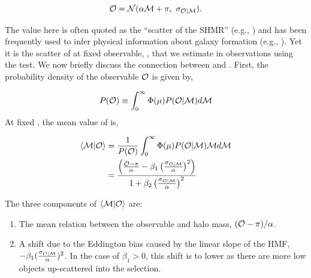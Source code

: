 \documentclass[fleqn,usenatbib,useAMS]{mnras}
\begin{document}
\begin{CJK*}{UTF8}{gbsn}
    \begin{equation}
        {\mathcal{O}} = \mathcal{N}(\alpha {\mathcal{M}} + \pi,\ \sigma_{\mathcal{O} | \mathcal{M}}).
        \label{eq:lognormal_obs_given_mhalo}
    \end{equation}

    The \scatterObsSymMhalo{} value here is often quoted as the ``scatter of the SHMR'' (e.g.,
    \citealt{More2011, Leauthaud2012, Reddick2013, Behroozi2013})
    and has been frequently used to infer physical information about galaxy formation (e.g.,
    \citealt{Gu2016, Matthee2017, Tinker2017c, Wechsler2018}).
    Yet it is the scatter of \mvir{} at fixed observable, \scatterMhaloObsSym{}, that we estimate in
    observations using the \topn{} test.
    We now briefly discuss the connection between \scatterObsSymMhalo{} and \scatterMhaloObsSym{}.
    First, the probability density of the observable ${\mathcal{O}}$ is given by,

    \begin{equation}
        P({\mathcal{O}}{}) \equiv \int_{0}^{\infty} \Phi(\mu){} P({\mathcal{O}}{} | {\mathcal{M}}{}) d{\mathcal{M}}{}
    \end{equation}
    At fixed \obsSym{}, the mean value of \haloSym{} is,

    \begin{equation}
    \begin{aligned}
        \langle {\mathcal{M}}{} | {\mathcal{O}} \rangle
        &= \frac{1}{P({\mathcal{O}})}
            \int_{0}^{\infty} \Phi(\mu){} P({\mathcal{O}}{} | {\mathcal{M}}{}) {\mathcal{M}}{} d{\mathcal{M}}{} \\
        &= \frac{\left( \frac{{\mathcal{O}}- \pi}{\alpha} - \beta_1 \left(\frac{\sigma_{\mathcal{O} | \mathcal{M}}}{\alpha}\right)^2 \right)}{ 1 + \beta_2 \left(\frac{\sigma_{\mathcal{O} | \mathcal{M}}}{\alpha}\right)^2}
        \label{eq:mean_of_mu}
    \end{aligned}
    \end{equation}

    \noindent The three components of $\langle {\mathcal{M}}{} | {\mathcal{O}} \rangle$ are:

    \begin{enumerate}

        \item The mean relation between the observable and halo mass, $({\mathcal{O}}- \pi) / \alpha$.

        \item A shift due to the Eddington bias caused by the linear slope of the HMF, $-\beta_1
            (\frac{\sigma_{\mathcal{O} | \mathcal{M}}}{\alpha})^2$. In the case of $\beta_1 > 0$, this shift is to
            lower \haloSym{} as there are more low \haloSym{} objects up-scattered into the
            selection.


\end{enumerate}
\end{CJK*}
\end{document}
